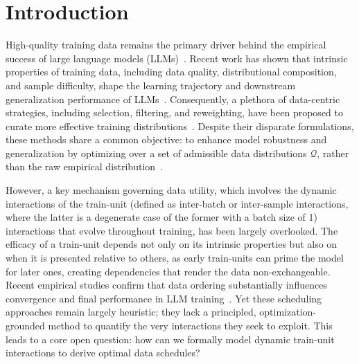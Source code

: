 \section{Introduction}

High-quality training data remains the primary driver behind the empirical success of large language models (LLMs)~\citep{Hsieh2023,Muennighoff2023,Mohan2024,villalobos2024position}. 
Recent work has shown that intrinsic properties of training data, including data quality, distributional composition, and sample difficulty, shape the learning trajectory and downstream generalization performance of LLMs~\cite{Xu2023HardSample,Hoffmann2022Chinchilla,doremi}.
Consequently, a plethora of data-centric strategies, including selection, filtering, and reweighting, have been proposed to curate more effective training distributions~\citep{Sorscher2022Beyond,Xie2023DataSelection,Albalak2024Survey}.
Despite their disparate formulations, these methods share a common objective: to enhance model robustness and generalization by optimizing over a set of admissible data distributions $\mathcal{Q}$, rather than the raw empirical distribution~\cite{Sagawa2019GroupDRO}.

However, a key mechanism governing data utility, which involves the dynamic interactions of the train-unit (defined as inter-batch or inter-sample interactions, where the latter is a degenerate case of the former with a batch size of 1) interactions that evolve throughout training, has been largely overlooked. The efficacy of a train-unit depends not only on its intrinsic properties but also on when it is presented relative to others, as early train-units can prime the model for later ones, creating dependencies that render the data non-exchangeable. Recent empirical studies confirm that data ordering substantially influences convergence and final performance in LLM training~\cite{Kim2024StrategicOrdering,Pouransari2024DatasetDecomposition,Jia2025CurriculumEffects}. Yet these scheduling approaches remain largely heuristic; they lack a principled, optimization-grounded method to quantify the very interactions they seek to exploit. This leads to a core open question: how can we formally model dynamic train-unit interactions to derive optimal data schedules?


